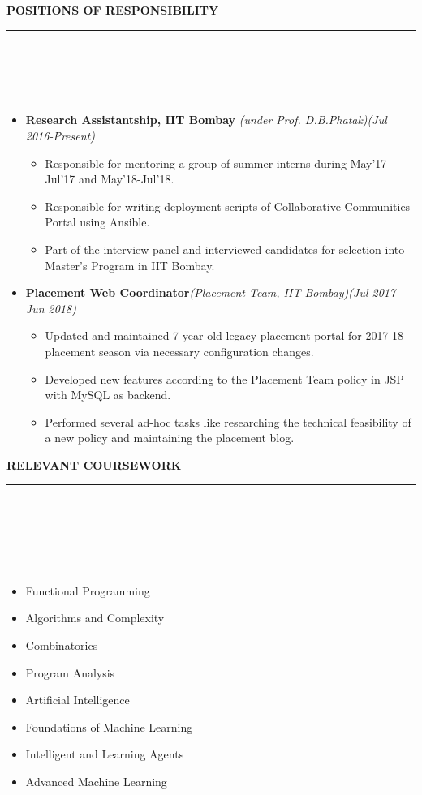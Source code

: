 \documentclass[a4paper,10pt]{article}
\newcommand{\lsep}{-0.5cm}
\newcommand{\resheading}[1]{{\small
        {
            \begin{minipage}
                {0.975\textwidth}\textbf{{\textsc{#1 \vphantom{p\^{E}} }}}
                \\[-0.3cm]
                \hrule
            \end{minipage}
            \\[-0.5cm]
        }
 }}
\begin{document}
\resheading{\textbf{\large POSITIONS OF RESPONSIBILITY}}\\[\lsep] 
\\[-0.4cm]
\begin{itemize}
    \item \textbf{Research Assistantship, IIT Bombay }\emph{(under Prof. D.B.Phatak)}\hfill {\emph{(Jul 2016-Present)}} \\[-0.6cm]
        \begin{itemize}
                \item Responsible for mentoring a group of summer interns during May'17-Jul'17 and May'18-Jul'18.
                \item Responsible for writing deployment scripts of Collaborative Communities Portal using Ansible.
                \item Part of the interview panel and interviewed candidates for selection into Master's Program in IIT Bombay.
        \end{itemize}
    \item \textbf{Placement Web Coordinator}\emph{(Placement Team, IIT Bombay)}\hfill {\emph{(Jul 2017-Jun 2018)}} \\[-0.6cm]
        \begin{itemize}
                \item Updated and maintained 7-year-old legacy placement portal for 2017-18 placement season via necessary configuration changes.
                \item Developed new features according to the Placement Team policy in JSP with MySQL as backend.
                \item Performed several ad-hoc tasks like researching the technical feasibility of a new policy and maintaining the placement blog.
        \end{itemize}
\end{itemize}
\vspace{0.1cm}
\resheading{\textbf{\large RELEVANT COURSEWORK}} \\[\lsep] \\
\\[-0.8cm]
\begin{multicols}{2}
\begin{itemize}
  \item Functional Programming
  \item Algorithms and Complexity
  \item Combinatorics
  \item Program Analysis
  \item Artificial Intelligence
  \item Foundations of Machine Learning
  \item Intelligent and Learning Agents
  \item Advanced Machine Learning
\end{itemize}
\end{multicols}
\end{document}
